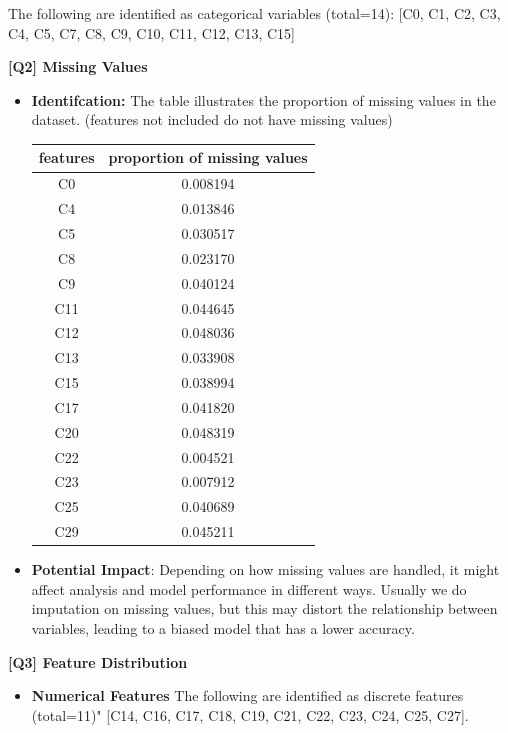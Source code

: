 \documentclass{article}
\begin{document}
\begin{description}
\begin{itemize}
				The following are identified as categorical variables (total=14): [C0, C1, C2, C3, C4, C5, C7, C8,
				C9, C10, C11, C12, C13, C15]
	\end{itemize}
	\item \textbf{[Q2] Missing Values}
		\begin{itemize}
			\item \textbf{Identifcation: } The table illustrates the proportion of missing values in the dataset. (features not included do not have missing values)
				\begin{center}
					\begin{tabular}{|c|c|}
						\hline
						features & proportion of missing values \\
						\hline
						C0   &  0.008194 \\
						C4   &  0.013846 \\
						C5   &  0.030517 \\
						C8   &  0.023170 \\
						C9   &  0.040124 \\
						C11  &  0.044645 \\
						C12  &  0.048036 \\
						C13  &  0.033908 \\
						C15  &  0.038994 \\
						C17  &  0.041820 \\
						C20  &  0.048319 \\
						C22  &  0.004521 \\
						C23  &  0.007912 \\
						C25  &  0.040689 \\
						C29  &  0.045211  \\
						\hline
					\end{tabular}
				\end{center}
			\item \textbf{Potential Impact}: Depending on how missing values are handled, it might affect analysis and model performance in different ways. Usually we do imputation on missing values, but this may distort the relationship between variables, leading to a biased model that has a lower accuracy.
		\end{itemize}
	\item \textbf{[Q3] Feature Distribution}
		\begin{itemize}
			\item \textbf{Numerical Features}
			The following are identified as discrete features (total=11)"
			[C14, C16, C17, C18, C19, C21, C22, C23, C24, C25, C27].


\end{itemize}
\end{description}
\end{document}
